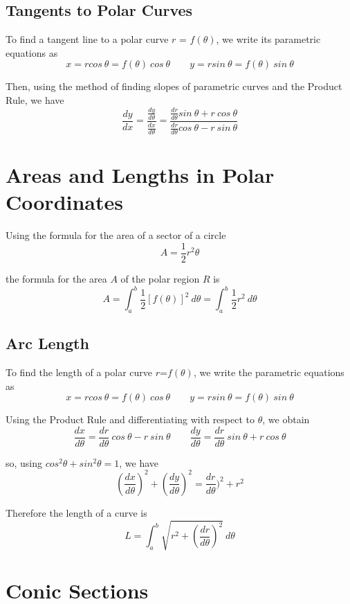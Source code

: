 \subsection*{Tangents to Polar Curves}
To find a tangent line to a polar curve $r$ = $f(\theta)$, we write its parametric equations as
$$ x=r cos \: \theta=f(\theta)\:cos \: \theta \qquad y = r sin \: \theta = f(\theta)\:sin \: \theta$$

Then, using the method of finding slopes of parametric curves and the Product Rule, we have
$$ \frac{dy}{dx}=\frac{\frac{dy}{d\theta}}{\frac{dx}{d\theta}}=\frac{\frac{dr}{d\theta}sin\:
        \theta+r\:cos\:\theta}{\frac{dr}{d\theta}cos\:\theta-r\:sin\:\theta} $$

\section{Areas and Lengths in Polar Coordinates}

Using the formula for the area of a sector of a circle
$$ A=\frac{1}{2}r^2\theta $$

the formula for the area $A$ of the polar region $R$ is
$$ A=\int_a^b\frac{1}{2}[f(\theta)]^2 \: d\theta  = \int_a^b\frac{1}{2}r^2 \: d\theta$$

\subsection*{Arc Length}

To find the length of a polar curve $r$=$f(\theta)$, we write the parametric equations as
$$ x=r cos \: \theta=f(\theta)\:cos \: \theta \qquad y = r sin \: \theta = f(\theta)\:sin \: \theta$$

Using the Product Rule and differentiating with respect to $\theta$, we obtain
$$ \frac{dx}{d\theta}=\frac{dr}{d\theta}\:cos\:\theta-r\:sin\:\theta \qquad \frac{dy}{d\theta}=
    \frac{dr}{d\theta}\:sin\:\theta+r\:cos\:\theta $$

so, using $cos^2\theta + sin^2\theta = 1$, we have
$$ \left(\frac{dx}{d\theta}\right)^2 + \left(\frac{dy}{d\theta}\right)^2 = \frac{dr}{d\theta})^2 + r^2$$

Therefore the length of a curve is
$$ L=\int_a^b\sqrt{r^2+\left(\frac{dr}{d\theta}\right)^2}\:d\theta $$

\section{Conic Sections}

